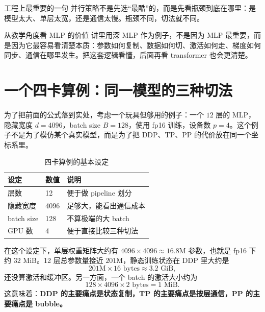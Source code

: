 \documentclass[a4paper]{article}
\begin{document}
\begin{importantbox}{工程上最重要的一句}
并行策略不是先选“最酷”的，而是先看瓶颈到底在哪里：是模型太大、单层太宽，还是通信太慢。瓶颈不同，切法就不同。
\end{importantbox}

\begin{knowledgebox}{从教学角度看 MLP 的价值}
讲里用深 MLP 作为例子，不是因为 MLP 最重要，而是因为它最容易看清楚本质：参数如何复制、数据如何切、激活如何走、梯度如何同步、通信在哪里发生。把这套逻辑看懂，后面再看 transformer 也会更清楚。
\end{knowledgebox}

\section{一个四卡算例：同一模型的三种切法}

为了把前面的公式落到实处，考虑一个玩具但够用的例子：一个 $12$ 层的 MLP，隐藏宽度 $d=4096$，batch size $B=128$，使用 fp16 训练，设备数 $p=4$。这个例子不是为了模仿某个真实模型，而是为了把 DDP、TP、PP 的代价放在同一个坐标系里。

\begin{table}[H]
\centering
\small
\begin{tabular}{p{3.1cm}p{3.7cm}p{4.2cm}}
\toprule
\textbf{设定} & \textbf{数值} & \textbf{说明} \\
\midrule
层数 & 12 & 便于做 pipeline 划分 \\
隐藏宽度 & 4096 & 足够大，能看出通信成本 \\
batch size & 128 & 不算极端的大 batch \\
GPU 数 & 4 & 便于直接比较三种切法 \\
\bottomrule
\end{tabular}
\caption{四卡算例的基本设定}
\end{table}

在这个设定下，单层权重矩阵大约有 $4096\times4096 \approx 16.8$M 参数，也就是 fp16 下约 $32$ MiB。12 层总参数量接近 $201$M，静态训练状态在 DDP 里大约是
\[
201\text{M} \times 16 \text{ bytes} \approx 3.2\text{ GiB},
\]
还没算激活和缓冲区。另一方面，一个 batch 的激活大小约为
\[
128 \times 4096 \times 2 \text{ bytes} = 1\text{ MiB}.
\]
这意味着：\textbf{DDP 的主要痛点是状态复制，TP 的主要痛点是按层通信，PP 的主要痛点是 bubble。}
\end{document}
